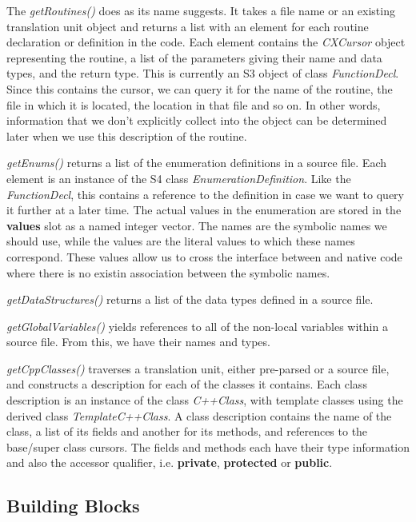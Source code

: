 \documentclass[article]{jss}
\def\Cpp{\proglang{C$++$}}
\def\R{\proglang{R}}
\def\Rfunc#1{\textsl{#1()}}
\def\Rclass#1{\textit{#1}}
\def\Rslot#1{\textbf{#1}}
\def\Cppkeyword#1{\textbf{#1}}
\begin{document}
The \Rfunc{getRoutines} does as its name suggests. It takes a file
name or an existing translation unit object and returns a list with an
element for each routine declaration or definition in the code.  Each
element contains the \Rclass{CXCursor} object representing the
routine, a list of the parameters giving their name and data types,
and the return type.  This is currently an S3 object of class
\Rclass{FunctionDecl}. Since this contains the cursor, we can query it
for the name of the routine, the file in which it is located, the
location in that file and so on. In other words, information that
we don't explicitly collect into the \R{} object can be determined
later when we use this description of the routine.

\Rfunc{getEnums} returns a list of the enumeration definitions in a
source file. Each element is an instance of the S4 class
\Rclass{EnumerationDefinition}.  Like the \Rclass{FunctionDecl}, this
contains a reference to the definition in case we want to query it
further at a later time.  The actual values in the enumeration are
stored in the \Rslot{values} slot as a named integer vector.  The
names are the symbolic names we should use, while the values are the
literal values to which these names correspond.  These values allow us
to cross the interface between \R{} and native code where there is no
existin association between the symbolic names.

\Rfunc{getDataStructures} returns a list of the data types defined in
a source file.


\Rfunc{getGlobalVariables} yields references to all of the non-local
variables within a source file.  From this, we have their names and
types.

\Rfunc{getCppClasses} traverses a translation unit, either pre-parsed
or a source file, and constructs a description for each of the \Cpp{}
classes it contains. Each class description is an instance of the
class \Rclass{C++Class}, with template classes using the derived class
\Rclass{TemplateC++Class}.  A class description contains the name of
the class, a list of its fields and another for its methods, and
references to the base/super class cursors.  The fields and methods
each have their type information and also the accessor qualifier,
i.e. \Cppkeyword{private}, \Cppkeyword{protected} or
\Cppkeyword{public}.


\subsection{Building Blocks}
\end{document}
